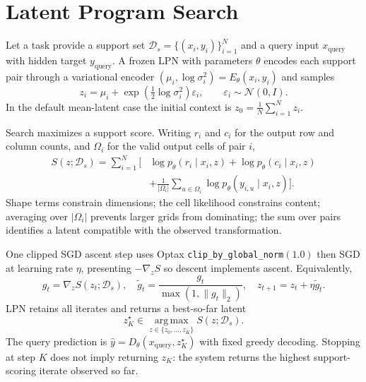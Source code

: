 \documentclass[11pt,a4paper]{article}
\begin{document}
\section{Latent Program Search}

Let a task provide a support set
$\mathcal{D}_{s}=\{(x_i,y_i)\}_{i=1}^{N}$
and a query input $x_{\mathrm{query}}$ with hidden target $y_{\mathrm{query}}$.
A frozen LPN with parameters $\theta$ encodes each support pair through a
variational encoder
$(\mu_i,\log\sigma_i^2)=E_\theta(x_i,y_i)$
and samples
\begin{equation}
z_i
=
\mu_i
+
\exp\!\left(\tfrac12\log\sigma_i^2\right)\varepsilon_i,
\qquad
\varepsilon_i\sim\mathcal{N}(0,I).
\end{equation}
In the default mean-latent case the initial context is
$z_0=\frac1N\sum_{i=1}^{N}z_i$.

Search maximizes a support score.
Writing $r_i$ and $c_i$ for the output row and column counts, and
$\Omega_i$ for the valid output cells of pair $i$,
\begin{equation}
\begin{aligned}
S(z;\mathcal{D}_s)
=
\sum_{i=1}^{N}
\Big[
&\log p_\theta(r_i\mid x_i,z)
+
\log p_\theta(c_i\mid x_i,z)\\
&+
\tfrac{1}{|\Omega_i|}
\sum_{u\in\Omega_i}
\log p_\theta(y_{i,u}\mid x_i,z)
\Big].
\end{aligned}
\end{equation}
Shape terms constrain dimensions; the cell likelihood constrains content;
averaging over $|\Omega_i|$ prevents larger grids from dominating; the sum over
pairs identifies a latent compatible with the observed transformation.

One clipped SGD ascent step uses Optax \texttt{clip\_by\_global\_norm}$(1.0)$
then SGD at learning rate $\eta$, presenting $-\nabla_z S$ so descent implements
ascent. Equivalently,
\begin{equation}
g_t=\nabla_z S(z_t;\mathcal{D}_s),\quad
\widetilde{g}_t=\frac{g_t}{\max(1,\|g_t\|_2)},\quad
z_{t+1}=z_t+\eta\widetilde{g}_t.
\end{equation}
LPN retains all iterates and returns a best-so-far latent
\begin{equation}
z^\star_K
\in
\operatorname*{arg\,max}_{z\in\{z_0,\ldots,z_K\}}
S(z;\mathcal{D}_s).
\end{equation}
The query prediction is
$\widehat{y}=D_\theta(x_{\mathrm{query}},z^\star_K)$
with fixed greedy decoding.
Stopping at step $K$ does not imply returning $z_K$: the system returns the
highest support-scoring iterate observed so far.
\end{document}
